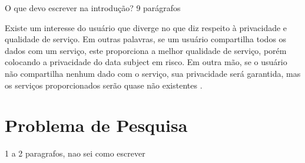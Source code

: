   \label{introducao}




O que devo escrever na introdução? 9 parágrafos 

Existe um interesse do usuário que diverge no que diz respeito à privacidade e qualidade de serviço. Em outras palavras, se um usuário compartilha todos os dados com um serviço, este proporciona a melhor qualidade de serviço, porém colocando a privacidade do data subject em risco. Em outra mão, se o usuário não compartilha nenhum dado com o serviço, sua privacidade será garantida, mas os serviços proporcionados serão quase não existentes \cite{EPICUREAN}.



\section{Problema de Pesquisa}

1 a 2 paragrafos, nao sei como escrever


